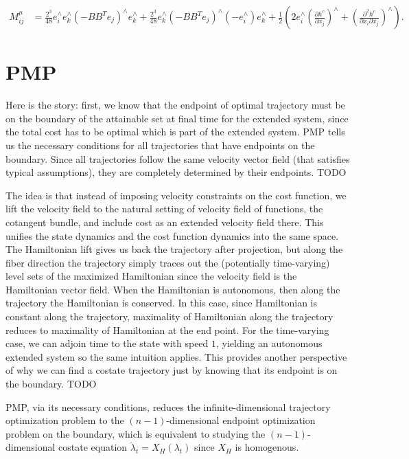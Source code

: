 \documentclass[12pt,class=article,crop=false]{standalone}
\begin{document}
\begin{align*}
	M_{ij}^{\mu} &= \frac{2^3}{48} e_i^\wedge  e_k^\wedge  \left( - BB^{T} e_j \right)^\wedge e_k^\wedge + \frac{2^3}{48} e_k^\wedge  \left( - BB^{T} e_j \right)^\wedge (- e_i^\wedge ) e_k^\wedge+ \frac{1}{2} \left( 2 e_i^\wedge \left(\frac{\partial h^c}{\partial x_j} \right)^\wedge  + \left(\frac{\partial^2 h^c}{\partial { x_i} \partial x_j}\right)^\wedge   \right)  .
\end{align*}

\section{PMP}

Here is the story: first, we know that the endpoint of optimal trajectory must be on the boundary of the attainable set at final time for the extended system, since the total cost has to be optimal which is part of the extended system. PMP tells us the necessary conditions for all trajectories that have endpoints on the boundary. Since all trajectories follow the same velocity vector field (that satisfies typical assumptions), they are completely determined by their endpoints. TODO

The idea is that instead of imposing velocity constraints on the cost function, we lift the velocity field to the natural setting of velocity field of functions, the cotangent bundle, and include cost as an extended velocity field there. This unifies the state dynamics and the cost function dynamics into the same space. The Hamiltonian lift gives us back the trajectory after projection, but along the fiber direction the trajectory simply traces out the (potentially time-varying) level sets of the maximized Hamiltonian since the velocity field is the Hamiltonian vector field. When the Hamiltonian is autonomous, then along the trajectory the Hamiltonian is conserved. In this case, since Hamiltonian is constant along the trajectory, maximality of Hamiltonian along the trajectory reduces to maximality of Hamiltonian at the end point. For the time-varying case, we can adjoin time to the state with speed $ 1$, yielding an autonomous extended system so the same intuition applies. This provides another perspective of why we can find a costate trajectory just by knowing that its endpoint is on the boundary. TODO

PMP, via its necessary conditions, reduces the infinite-dimensional trajectory optimization problem to the $ (n-1)$-dimensional endpoint optimization problem on the boundary, which is equivalent to studying the $ (n-1)$-dimensional costate equation $ \dot{ \lambda}_t = X_H ( \lambda_t)  $ since $ X_H $ is homogenous.
\end{document}
